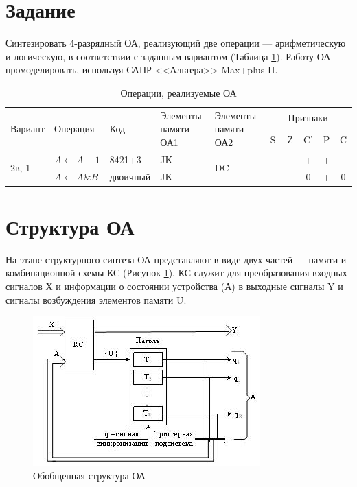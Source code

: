 
\newpage
\section{Задание}

Синтезировать 4-разрядный ОА, реализующий две операции --- арифметическую и логическую, в соответствии с заданным вариантом (Таблица \ref{table:task}). Работу ОА промоделировать, используя САПР <<Альтера>> Max+plus II.

\begin{table}[H]
	\centering
	\caption{Операции, реализуемые ОА}
	\label{table:task}
	\begin{tabular}{| l | l | l | p{2.2cm} | p{2.2cm} | c | c | c | c | c |} \hline
		\multirow{2}{2cm}{Вариант} & \multirow{2}{2cm}{Операция} & \multirow{2}{2cm}{Код} & \multirow{2}{2.2cm}{Элементы памяти ОА1} & \multirow{2}{2.2cm}{Элементы памяти ОА2} & \multicolumn{5}{c|}{Признаки} \\ \cline{6-10}
		& & & & & S & Z & C' & P & C \\ \hline 
		\multirow{2}{2cm}{2в, 1} & $A \leftarrow A - 1$ & 8421+3 & JK & \multirow{2}{2.2cm}{DC} & + & + & + & + & - \\ \cline{2-4} \cline{6-10}

		& $A \leftarrow A \& B$ & двоичный & JK & & + & + & 0 & + & 0 \\ \hline 
	\end{tabular}
\end{table}


\newpage
\section{Структура ОА}

На этапе структурного синтеза ОА представляют в виде двух частей --- памяти и комбинационной схемы КС (Рисунок \ref{figure:oooa}). КС служит для преобразования входных сигналов Х и информации о состоянии устройства (А) в выходные сигналы Y и сигналы возбуждения элементов памяти U.

\begin{figure}[H]
	\includegraphics[scale=0.6]{images/2.png}
	\caption{Обобщенная структура ОА}
	\label{figure:oooa}
\end{figure}

